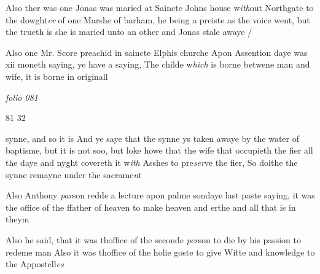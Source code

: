 \documentclass[12pt, a4paper]{book}
\begin{document}
	
		\ifthenelse{\isodd{\thepage}}
		{\reversemarginpar}
		{\normalmarginpar}
		Also ther was one Jonas was maried at
 Saincte Johns house w\textit{ith}out Northgate to the dowght\textit{er}
 of one Marshe of barham, he being a preiste as the
 voice went, but the trueth is she is maried unto
 an other and Jonas stale awaye /

 
 	
				\marginpar[\vspace{0.5cm}{\textcolor{Gray}{Scory}}]{}
			
 	
		\ifthenelse{\isodd{\thepage}}
		{\reversemarginpar}
		{\normalmarginpar}
		Also one Mr. Score preachid in saincte Elphis
 churche Apon Assention daye was xii moneth
 saying, ye have a saying, The childe w\textit{hich} is borne
 betwene man and wife, it is borne in originall
 


\dotfill
						\newpage
{}

\textit{folio 081}


\begin{flushright}{\color{Mahogany}81} 32\end{flushright}
 
 	
				\marginpar[\vspace{0.5cm}{\textcolor{Gray}{herecie}}]{}
			
	
				\marginpar[\vspace{0.5cm}{\textcolor{Gray}{n}}]{}
			
	
		\ifthenelse{\isodd{\thepage}}
		{\reversemarginpar}
		{\normalmarginpar}
		synne, and so it is And ye saye that the synne ys taken
 awaye by the water of baptisme, but it is not soo, but
  loke howe that the wife that occupieth the fier all
 the daye and nyght covereth it w\textit{ith} Asshes to pre\textit{ser}ve
 the fier, So doithe the synne remayne under the sacrame\textit{n}t

	
		
			
		
		\ifthenelse{\isodd{\thepage}}
		{\reversemarginpar}
		{\normalmarginpar}
		Also Anthony \textit{par}son redde a lecture apon palme
 sondaye last paste saying, it was the office of the
 ffather of heaven to make heaven and erthe and all
 that is in theym
 
		\ifthenelse{\isodd{\thepage}}
		{\reversemarginpar}
		{\normalmarginpar}
		Also he said, that it was thoffice of the seconde \textit{per}son
 to die by his passion to redeme man
 Also it was thoffice of the holie goste to give
 Witte and knowledge to the Appostell\textit{es}
	
\end{document}
